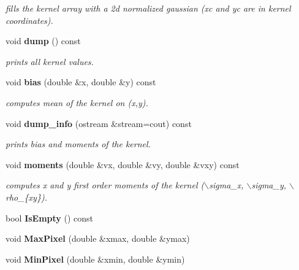 \begin{CompactItemize}
\begin{CompactList}\small\item\em fills the kernel array with a 2d normalized gaussian (xc and yc are in kernel coordinates).\item\end{CompactList}\item 
{}
void {\bf dump} () const\label{class_kernel_a14}

\begin{CompactList}\small\item\em prints all kernel values.\item\end{CompactList}\item 
{}
void {\bf bias} (double \&x, double \&y) const\label{class_kernel_a15}

\begin{CompactList}\small\item\em computes mean of the kernel on (x,y).\item\end{CompactList}\item 
{}
void {\bf dump\_\-info} (ostream \&stream=cout) const\label{class_kernel_a16}

\begin{CompactList}\small\item\em prints bias and moments of the kernel.\item\end{CompactList}\item 
{}
void {\bf moments} (double \&vx, double \&vy, double \&vxy) const\label{class_kernel_a17}

\begin{CompactList}\small\item\em computes x and y first order moments of the kernel ($\backslash$sigma\_\-x, $\backslash$sigma\_\-y, $\backslash$rho\_\-\{xy\}).\item\end{CompactList}\item 
{}
bool {\bf Is\-Empty} () const\label{class_kernel_a18}

\item 
{}
void {\bf Max\-Pixel} (double \&xmax, double \&ymax)\label{class_kernel_a19}

\item 
{}
void {\bf Min\-Pixel} (double \&xmin, double \&ymin)\label{class_kernel_a20}

\end{CompactItemize}
